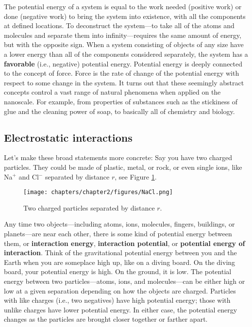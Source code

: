 The potential energy of a system is equal to the work needed (positive work) or done (negative work) to bring the system into existence, with all the components at defined locations. To deconstruct the system---to take all of the atoms and molecules and separate them into infinity---requires the same amount of energy, but with the opposite sign. When a system consisting of objects of any size have a lower energy than all of the components considered separately, the system has a \textbf{favorable} (i.e., negative) potential energy. Potential energy is deeply connected to the concept of force. Force is the rate of change of the potential energy with respect to some change in the system. It turns out that these seemingly abstract concepts control a vast range of natural phenomena when applied on the nanoscale. For example, from properties of substances such as the stickiness of glue and the cleaning power of soap, to basically all of chemistry and biology. 

    \subsection{Electrostatic interactions}\label{electrostatic}

    Let’s make these broad statements more concrete: Say you have two charged particles. They could be made of plastic, metal, or rock, or even single ions, like Na$^{+}$ and Cl$^{-}$ separated by distance $r$, see Figure \ref{fig:NaCl}.

\begin{figure}[h!]
\centering
  \texttt{[image: chapters/chapter2/figures/NaCl.png]}
  \caption{Two charged particles separated by distance $r$.}
  \label{fig:NaCl}
\end{figure}

    Any time two objects---including atoms, ions, molecules, fingers, buildings, or planets---are near each other, there is some kind of potential energy between them, or \textbf{interaction energy}, \textbf{interaction potential}, or \textbf{potential energy of interaction}. Think of the gravitational potential energy between you and the Earth when you are someplace high up, like on a diving board. On the diving board, your potential energy is high. On the ground, it is low. The potential energy between two particles---atoms, ions, and molecules---can be either high or low at a given separation depending on how the objects are charged. Particles with like charges (i.e., two negatives) have high potential energy; those with unlike charges have lower potential energy. In either case, the potential energy changes as the particles are brought closer together or farther apart.
    
